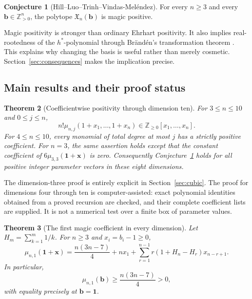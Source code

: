 \documentclass[11pt]{article}
\newtheorem{theorem}{Theorem}[section]
\theoremstyle{definition}
\newtheorem{conjecture}[theorem]{Conjecture}
\newcommand{\Z}{\mathbb Z}
\newcommand{\bb}{\mathbf b}
\newcommand{\xx}{\mathbf x}
\newcommand{\one}{\mathbf 1}
\newcommand{\X}{\mathfrak X}
\numberwithin{equation}{section}
\begin{document}
\begin{conjecture}[Hill--Luo--Trinh--Vindas-Mel\'endez]
\label{conj:target}
For every $n\ge3$ and every $\bb\in\Z_{>0}^n$, the polytope $\X_n(\bb)$ is
magic positive.
\end{conjecture}

Magic positivity is stronger than ordinary Ehrhart positivity. It also
implies real-rootedness of the $h^*$-polynomial through Br\"and\'en's
transformation theorem \cite[Theorem~4.2]{Branden}. This explains why changing
the basis is useful rather than merely cosmetic. Section~\ref{sec:consequences}
makes the implication precise.

\subsection{Main results and their proof status}
\begin{theorem}[Coefficientwise positivity through dimension ten]
\label{thm:main}
For $3\le n\le10$ and $0\le j\le n$,
\begin{equation}
 n!\mu_{n,j}(1+x_1,\ldots,1+x_n)\in
       \Z_{\ge0}[x_1,\ldots,x_n].
 \label{eq:strong}
\end{equation}
For $4\le n\le10$, every monomial of total degree at most $j$ has a
strictly positive coefficient. For $n=3$, the same assertion holds except
that the constant coefficient of $6\mu_{3,3}(\one+\xx)$ is zero.
Consequently Conjecture~\ref{conj:target} holds for all positive integer
parameter vectors in these eight dimensions.
\end{theorem}

The dimension-three proof is entirely explicit in
Section~\ref{sec:cubic}. The proof for dimensions four through ten is
computer-assisted: exact polynomial identities obtained from a proved
recursion are checked, and their complete coefficient lists are supplied.
It is not a numerical test over a finite box of parameter values.

\begin{theorem}[The first magic coefficient in every dimension]
\label{thm:first-intro}
Let $H_m=\sum_{k=1}^m1/k$. For $n\ge3$ and $x_i=b_i-1\ge0$,
\begin{equation}
 \mu_{n,1}(\one+\xx)
 =\frac{n(3n-7)}4+n x_1+
  \sum_{r=1}^{n-1}r(1+H_n-H_r)x_{n-r+1}.
 \label{eq:first-intro}
\end{equation}
In particular,
\[
 \mu_{n,1}(\bb)\ge \frac{n(3n-7)}4>0,
\]
with equality precisely at $\bb=\one$.
\end{theorem}
\end{document}
